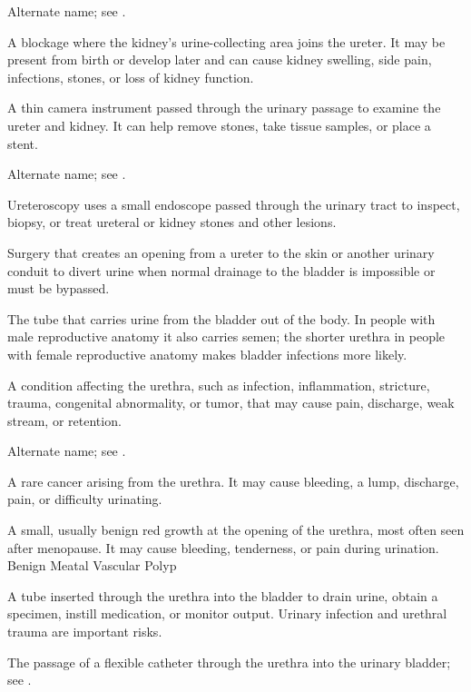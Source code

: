  Alternate name; see .

 A blockage where the kidney’s urine-collecting area joins the ureter. It may be present from birth or develop later and can cause kidney swelling, side pain, infections, stones, or loss of kidney function.

 A thin camera instrument passed through the urinary passage to examine the ureter and kidney. It can help remove stones, take tissue samples, or place a stent.

 Alternate name; see .

 Ureteroscopy uses a small endoscope passed through the urinary tract to inspect, biopsy, or treat ureteral or kidney stones and other lesions.

 Surgery that creates an opening from a ureter to the skin or another urinary conduit to divert urine when normal drainage to the bladder is impossible or must be bypassed.

 The tube that carries urine from the bladder out of the body. In people with male reproductive anatomy it also carries semen; the shorter urethra in people with female reproductive anatomy makes bladder infections more likely.

 A condition affecting the urethra, such as infection, inflammation, stricture, trauma, congenital abnormality, or tumor, that may cause pain, discharge, weak stream, or retention.

 Alternate name; see .

 A rare cancer arising from the urethra. It may cause bleeding, a lump, discharge, pain, or difficulty urinating.

 A small, usually benign red growth at the opening of the urethra, most often seen after menopause. It may cause bleeding, tenderness, or pain during urination.
\synonyms
Benign Meatal Vascular Polyp

 A tube inserted through the urethra into the bladder to drain urine, obtain a specimen, instill medication, or monitor output. Urinary infection and urethral trauma are important risks.

 The passage of a flexible catheter through the urethra into the urinary bladder; see .

